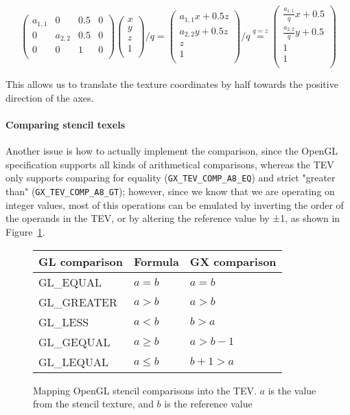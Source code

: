 \documentclass[12pt]{article}
\begin{document}
$$ \begin{pmatrix}
    a_{1,1} & 0   & 0.5 & 0 \\
    0    & a_{2,2} & 0.5 & 0 \\
    0    & 0   & 1   & 0 \\
\end{pmatrix}
\begin{pmatrix}
    x\\
    y\\
    z\\
    1\\
\end{pmatrix}
/ q
=
\begin{pmatrix}
    a_{1,1}x + 0.5z\\
    a_{2,2}y + 0.5z\\
    z\\
    1\\
\end{pmatrix}
/ q
\stackrel{q=z}{=}
\begin{pmatrix}
    \frac{a_{1,1}}{q}x + 0.5\\
    \frac{a_{2,2}}{q}y + 0.5\\
    1\\
    1\\
\end{pmatrix}
$$

This allows us to translate the texture coordinates by half towards the positive direction of the axes.


\paragraph{Comparing stencil texels}

Another issue is how to actually implement the comparison, since the OpenGL specification supports all kinds of arithmetical comparisons, whereas the TEV only supports comparing for equality (\lstinline{GX_TEV_COMP_A8_EQ}) and strict "greater than" (\lstinline{GX_TEV_COMP_A8_GT}); however, since we know that we are operating on integer values, most of this operations can be emulated by inverting the order of the operands in the TEV, or by altering the reference value by ±1, as shown in Figure~\ref{table:stencil1}.

\begin{figure}[ht]
\centering

\begin{tabular}{|l|l|l|}
\hline
    {GL comparison} & {Formula} & {GX comparison} \\
\hline
    GL\_EQUAL & $a = b$ & $a = b$ \\
\hline
	GL\_GREATER & $a > b$ & $a > b$\\
\hline
	GL\_LESS & $a < b$ & $b > a$\\
\hline
	GL\_GEQUAL & $a \geq b$ & $a > b - 1$ \\
\hline
	GL\_LEQUAL & $a \leq b$ & $b + 1 > a$ \\
\hline
\end{tabular}
\caption{Mapping OpenGL stencil comparisons into the TEV. $a$ is the value from the stencil texture, and $b$ is the reference value}
\label{table:stencil1}
\end {figure}
\end{document}
